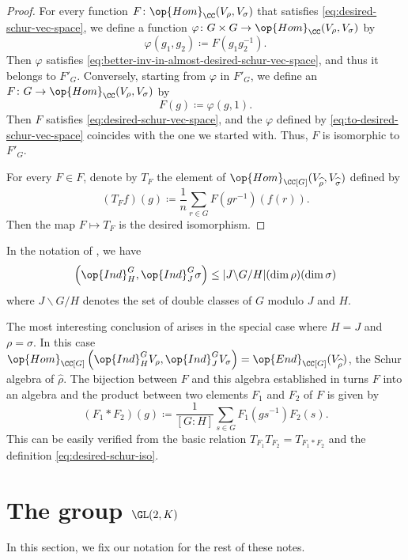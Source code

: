 \documentclass[../main.tex]{subfiles}
\begin{document}
\begin{proof}
	For every function $F\colon\op{Hom}_\CC(V_\rho,V_\sigma)$ that satisfies \eqref{eq:desired-schur-vec-space}, we define a function $\varphi\colon G\times G\to\op{Hom}_\CC(V_\rho,V_\sigma)$ by
	\begin{equation}
		\varphi(g_1,g_2)\coloneqq F\left(g_1g_2^{-1}\right). \label{eq:to-desired-schur-vec-space}
	\end{equation}
	Then $\varphi$ satisfies \eqref{eq:better-inv-in-almost-desired-schur-vec-space}, and thus it belongs to $F'_G$. Conversely, starting from $\varphi$ in $F'_G$, we define an $F\colon G\to\op{Hom}_\CC(V_\rho,V_\sigma)$ by
	\[F(g)\coloneqq\varphi(g,1).\]
	Then $F$ satisfies \eqref{eq:desired-schur-vec-space}, and the $\varphi$ defined by \eqref{eq:to-desired-schur-vec-space} coincides with the one we started with. Thus, $F$ is isomorphic to $F'_G$.

	For every $F\in F$, denote by $T_F$ the element of $\op{Hom}_{\CC[G]}(V_{\widehat\rho},V_{\widehat\sigma})$ defined by
	\begin{equation}
		(T_Ff)(g)\coloneqq\frac1n\sum_{r\in G}F\left(gr^{-1}\right)(f(r)). \label{eq:desired-schur-iso}
	\end{equation}
	Then the map $F\mapsto T_F$ is the desired isomorphism.
\end{proof}
\begin{corollary} \label{cor:dim-homs-of-ind}
	In the notation of , we have
	\[\left(\op{Ind}^G_H,\op{Ind}^G_J\sigma\right)\le|J\backslash G/H|(\dim\rho)(\dim\sigma)\]
	where $J\backslash G/H$ denotes the set of double classes of $G$ modulo $J$ and $H$.
\end{corollary}
The most interesting conclusion of  arises in the special case where $H=J$ and $\rho=\sigma$. In this case $\op{Hom}_{\CC[G]}\left(\op{Ind}^G_HV_\rho,\op{Ind}^G_JV_\sigma\right)=\op{End}_{\CC[G]}(V_{\widehat\rho})$, the Schur algebra of $\widehat\rho$. The bijection between $F$ and this algebra established in  turns $F$ into an algebra and the product between two elements $F_1$ and $F_2$ of $F$ is given by
\begin{equation}
	(F_1*F_2)(g)\coloneqq\frac1{[G:H]}\sum_{s\in G}F_1\left(gs^{-1}\right)F_2(s). \label{eq:better-schur-ind-mult}
\end{equation}
This can be easily verified from the basic relation $T_{F_1}T_{F_2}=T_{F_1*F_2}$ and the definition \eqref{eq:desired-schur-iso}.

\section{The group \texorpdfstring{$\GL(2,K)$}{ GL(2,K)}} \label{sec:gl-2-k-struct}
In this section, we fix our notation for the rest of these notes.
\end{document}

